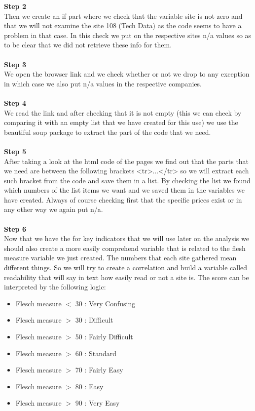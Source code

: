 \documentclass{article}
\begin{document}
\textbf{Step 2} \\Then we create an if part where we check that the variable site is not zero and that we will not examine the site 108 (Tech Data) as the code seems to have a problem in that case. In this check we put on the respective sites n/a values so as to be clear that we did not retrieve these info for them.\\\\
\textbf{Step 3} \\We open the browser link and we check whether or not we drop to any exception in which case we also put n/a values in the respective companies.\\\\
\textbf{Step 4} \\We read the link and after checking that it is not empty (this we  can check by comparing it with an empty list that we have created for this use) we use the beautiful soup package to extract the part of the code that we need.\\\\
\textbf{Step 5} \\After taking a look at the html code of the pages we find out that the parts that we need are between the following brackets <tr>...</tr> so we will extract each such bracket from the code and save them in a list. By checking the list we found which numbers of the list items we want and we saved them in the variables we have created. Always of course checking first that the specific prices exist or in any other way we again put n/a.\\\\
\textbf{Step 6} \\Now that we have the for key indicators that we will use later on the analysis we should also create a more easily comprehend variable that is related to the flesh measure variable we just created. The numbers that each site gathered mean different things. So we will try to create a correlation and build a variable called readability that will say in text how easily read or not a site is. The score can be interpreted by the following logic:
\begin{itemize}
\item Flesch measure $<$ 30 : Very Confusing
\item Flesch measure $>$ 30 : Difficult
\item Flesch measure $>$ 50 : Fairly Difficult
\item Flesch measure $>$ 60 : Standard
\item Flesch measure $>$ 70 : Fairly Easy
\item Flesch measure $>$ 80 : Easy
\item Flesch measure $>$ 90 : Very Easy
\end{itemize}
\end{document}
